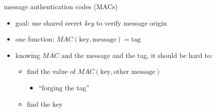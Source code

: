 \begin{frame}{message authentication codes (MACs)}
    \begin{itemize}
    \item goal: use shared secret \textit{key} to verify message origin
    \vspace{.5cm}
    \item one function: $MAC(\text{key}, \text{message}) = \text{tag}$
    \item knowing $MAC$ and the message and the tag, it should be hard to:
        \begin{itemize}
        \item find the value of $MAC(\text{key}, \text{other message})$
            \begin{itemize}
            \item ``forging the tag''
            \end{itemize}
        \item find the key
        \end{itemize}
    \end{itemize}
\end{frame}
